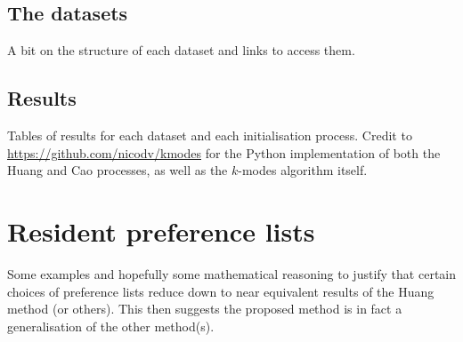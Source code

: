 \documentclass{article}
\theoremstyle{definition}
\begin{document}
\subsection{The datasets}\label{subsection:datasets}

A bit on the structure of each dataset and links to access them.


\subsection{Results}\label{subsection:results}

Tables of results for each dataset and each initialisation process. Credit to \url{https://github.com/nicodv/kmodes} for the Python implementation of both the Huang and Cao processes, as well as the $k$-modes algorithm itself.

\section{Resident preference lists}\label{section:preferences}

Some examples and hopefully some mathematical reasoning to justify that certain choices of preference lists reduce down to near equivalent results of the Huang method (or others). This then suggests the proposed method is in fact a generalisation of the other method(s).


\printbibliography
\end{document}
